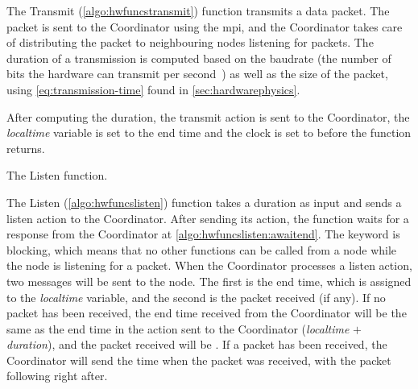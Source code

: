 The Transmit (\autoref{algo:hwfuncstransmit}) function transmits a data packet. The packet is sent
to the Coordinator using the \gls{mpi}, and the Coordinator takes care of distributing the packet to
neighbouring nodes listening for packets. The duration of a transmission is computed based on the
\gls{baudrate} (the number of bits the hardware can transmit per second~\cite{website:baudrate-mathworks}) as
well as the size of the packet, using \autoref{eq:transmission-time} found in \autoref{sec:hardwarephysics}.

After computing the duration, the transmit action is sent to the Coordinator, the \textit{localtime} variable
is set to the end time and the clock is set to \KwNow before the function returns. \medbreak

\begin{algorithm}[ht]
    \DontPrintSemicolon
    
    
    \caption{The Listen function.}
    \label{algo:hwfuncslisten}
\end{algorithm}

The Listen (\autoref{algo:hwfuncslisten}) function takes a duration as input and sends a listen action to the
Coordinator. After sending its action, the function waits for a response from the Coordinator at
\autoref{algo:hwfuncslisten:awaitend}. The \KwAwait keyword is blocking, which means that no other functions
can be called from a node while the node is listening for a packet. When the Coordinator processes a listen
action, two messages will be sent to the node. The first is the end time, which is assigned to the
\textit{localtime} variable, and the second is the packet received (if any). If no packet has been received,
the end time received from the Coordinator will be the same as the end time in the action sent to the
Coordinator (\textit{localtime} $+$ \textit{duration}), and the packet received will be \KwNull. If a packet
has been received, the Coordinator will send the time when the packet was received, with the packet following
right after.

